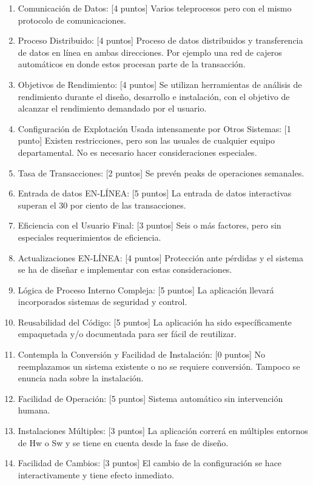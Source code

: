 \documentclass[a4paper,12pt,openany,oneside]{book}
\begin{document}
\begin{enumerate}
	\item Comunicación de Datos: [4 puntos] Varios teleprocesos pero con el mismo protocolo de comunicaciones.
	\item Proceso Distribuido: [4 puntos] Proceso de datos distribuidos y transferencia de datos en línea en ambas direcciones. Por ejemplo una red de cajeros automáticos en donde estos procesan parte de la transacción.
	\item Objetivos de Rendimiento: [4 puntos] Se utilizan herramientas de análisis de rendimiento durante el diseño, desarrollo e instalación, con el objetivo de alcanzar el rendimiento demandado por el usuario.
	\item Configuración de Explotación Usada intensamente por Otros Sistemas: [1 punto] Existen restricciones, pero son las usuales de cualquier equipo departamental. No es necesario hacer consideraciones especiales.
	\item Tasa de Transacciones: [2 puntos] Se prevén peaks de operaciones semanales.
	\item Entrada de datos EN-LÍNEA: [5 puntos] La entrada de datos interactivas superan el 30 por ciento de las transacciones.
	\item Eficiencia con el Usuario Final: [3 puntos] Seis o más factores, pero sin especiales requerimientos de eficiencia.
	\item Actualizaciones EN-LÍNEA: [4 puntos] Protección ante pérdidas y el sistema se ha de diseñar e implementar con estas consideraciones.
	\item Lógica de Proceso Interno Compleja: [5 puntos] La aplicación llevará incorporados sistemas de seguridad y control.
	\item Reusabilidad del Código: [5 puntos] La aplicación ha sido específicamente empaquetada y/o documentada para ser fácil de reutilizar.
	\item Contempla la Conversión y Facilidad de Instalación: [0 puntos] No reemplazamos un sistema existente o no se requiere conversión. Tampoco se enuncia nada sobre la instalación.
	\item Facilidad de Operación: [5 puntos] Sistema automático sin intervención humana.
	\item Instalaciones Múltiples: [3 puntos] La aplicación correrá en múltiples entornos de Hw o Sw y se tiene en cuenta desde la fase de diseño.
	\item Facilidad de Cambios: [3 puntos] El cambio de la configuración se hace interactivamente y tiene efecto inmediato.
\end{enumerate}
\end{document}
